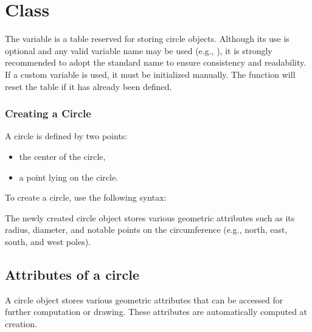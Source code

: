 \newpage
\section{Class } %
\label{sec:class_circle}

The  variable is a table reserved for storing circle objects. Although its use is optional and any valid variable name may be used (e.g., ), it is strongly recommended to adopt the standard name  to ensure consistency and readability. If a custom variable is used, it must be initialized manually. The  function will reset the  table if it has already been defined.


\subsubsection{Creating a Circle} %
\label{ssub:creating_a_circle}
A circle is defined by two points:
\begin{itemize}
\item the center of the circle,
\item a point lying on the circle.
\end{itemize}
\vspace{0.5em}
\noindent
To create a circle, use the following syntax:
\begin{mybox}
\end{mybox}
\noindent
The newly created circle object stores various geometric attributes such as its radius, diameter, and notable points on the circumference (e.g., north, east, south, and west poles).

\subsection{Attributes of a circle} %
\label{sub:attributes_of_a_circle}

A circle object stores various geometric attributes that can be accessed for further computation or drawing. These attributes are automatically computed at creation.

